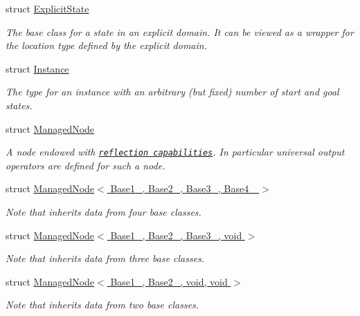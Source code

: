 \begin{DoxyCompactItemize}
struct \hyperlink{structslb_1_1core_1_1sb_1_1ExplicitState}{Explicit\+State}
\begin{DoxyCompactList}\small\item\em The base class for a state in an explicit domain. It can be viewed as a wrapper for the location type defined by the explicit domain. \end{DoxyCompactList}\item 
struct \hyperlink{structslb_1_1core_1_1sb_1_1Instance}{Instance}
\begin{DoxyCompactList}\small\item\em The type for an instance with an arbitrary (but fixed) number of start and goal states. \end{DoxyCompactList}\item 
struct \hyperlink{structslb_1_1core_1_1sb_1_1ManagedNode}{Managed\+Node}
\begin{DoxyCompactList}\small\item\em A node endowed with \href{http://stackoverflow.com/a/11744832/2725810}{\tt reflection capabilities}. In particular universal output operators are defined for such a node. \end{DoxyCompactList}\item 
struct \hyperlink{structslb_1_1core_1_1sb_1_1ManagedNode_3_01Base1___00_01Base2___00_01Base3___00_01Base4___01_4}{Managed\+Node$<$ Base1\+\_\+, Base2\+\_\+, Base3\+\_\+, Base4\+\_\+ $>$}
\begin{DoxyCompactList}\small\item\em Note that inherits data from four base classes. \end{DoxyCompactList}\item 
struct \hyperlink{structslb_1_1core_1_1sb_1_1ManagedNode_3_01Base1___00_01Base2___00_01Base3___00_01void_01_4}{Managed\+Node$<$ Base1\+\_\+, Base2\+\_\+, Base3\+\_\+, void $>$}
\begin{DoxyCompactList}\small\item\em Note that inherits data from three base classes. \end{DoxyCompactList}\item 
struct \hyperlink{structslb_1_1core_1_1sb_1_1ManagedNode_3_01Base1___00_01Base2___00_01void_00_01void_01_4}{Managed\+Node$<$ Base1\+\_\+, Base2\+\_\+, void, void $>$}
\begin{DoxyCompactList}\small\item\em Note that inherits data from two base classes. \end{DoxyCompactList}\item 

\end{DoxyCompactItemize}
